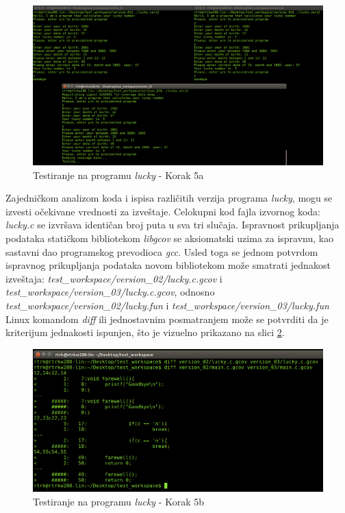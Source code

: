 \documentclass[12pt,oneside]{memoir}
\newcommand{\strano}[1]{\textit{#1}}
\begin{document}
\begin{figure}[!ht]
  \centering
  \includegraphics[width=\textwidth]{img/lucky5.png}
  \caption{Testiranje na programu \strano{lucky} - Korak 5a}
  \label{fig:lucky-test-5}
\end{figure}

Zajedničkom analizom koda i ispisa različitih verzija programa \strano{lucky}, mogu se izvesti očekivane vrednosti za izveštaje. Celokupni kod fajla izvornog koda: \strano{lucky.c} se izvršava identičan broj puta u sva tri slučaja. Ispravnost prikupljanja podataka statičkom bibliotekom \strano{libgcov} se aksiomatski uzima za ispravnu, kao sastavni dao programskog prevodioca \strano{gcc}. Usled toga se jednom potvrdom ispravnog prikupljanja podataka novom bibliotekom može smatrati jednakost izveštaja: \strano{test\_workspace/version\_02/lucky.c.gcov} i \strano{test\_workspace/version\_03/lucky.c.gcov}, odnosno
\strano{test\_workspace/version\_02/lucky.fun} i \strano{test\_workspace/version\_03/lucky.fun}
Linux komandom \strano{diff} ili jednostavnim posmatranjem može se potvrditi da je kriterijum jednakosti ispunjen, što je vizuelno prikazano na slici \ref{fig:lucky-test-6}.

\begin{figure}[!ht]
  \centering
  \includegraphics[width=\textwidth]{img/lucky6.png}
  \caption{Testiranje na programu \strano{lucky} - Korak 5b}
  \label{fig:lucky-test-6}
\end{figure}
\end{document}
